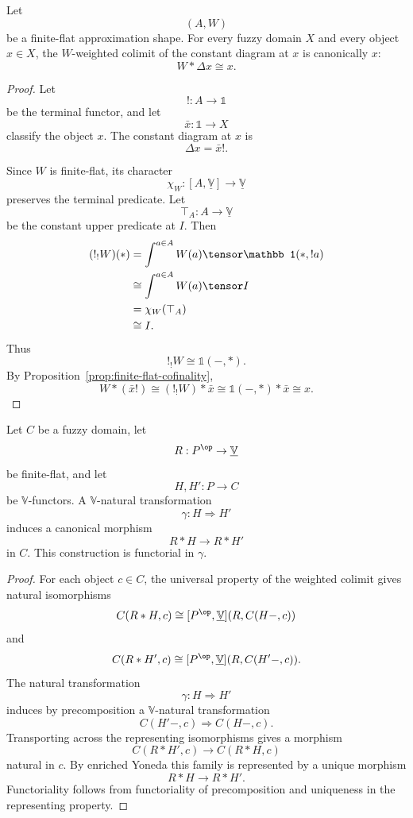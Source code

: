 \begin{lemma}
\label{lem:constant-diagrams-finite-flat}
Let
\[
    (A,W)
\]
be a finite-flat approximation shape.  For every fuzzy domain \(X\) and every
object \(x\in X\), the \(W\)-weighted colimit of the constant diagram at \(x\)
is canonically \(x\):
\[
    W*\Delta x\cong x.
\]
\end{lemma}

\begin{proof}
Let
\[
    !:A\to\mathbb 1
\]
be the terminal functor, and let
\[
    \bar x:\mathbb 1\to X
\]
classify the object \(x\).  The constant diagram at \(x\) is
\[
    \Delta x=\bar x!.
\]

Since \(W\) is finite-flat, its character
\[
    \chi_W:[A,\underline{\mathbb V}]\to\underline{\mathbb V}
\]
preserves the terminal predicate.  Let
\[
    \top_A:A\to\underline{\mathbb V}
\]
be the constant upper predicate at \(I\).  Then
\[
\begin{aligned}
    (!_!W)(*)
    &=
    \int^{a\in A}W(a)\tensor \mathbb 1(*,!a)
    \\
    &\cong
    \int^{a\in A}W(a)\tensor I
    \\
    &=
    \chi_W(\top_A)
    \\
    &\cong
    I.
\end{aligned}
\]
Thus
\[
    !_!W\cong \mathbb 1(-,*).
\]
By Proposition~\ref{prop:finite-flat-cofinality},
\[
    W*(\bar x!)
    \cong
    (!_!W)*\bar x
    \cong
    \mathbb 1(-,*)*\bar x
    \cong
    x.
\]
\end{proof}

\begin{lemma}
\label{lem:ff-colimits-functorial-in-diagrams}
Let \(C\) be a fuzzy domain, let
\[
    R:P^{\op}\to\underline{\mathbb V}
\]
be finite-flat, and let
\[
    H,H':P\to C
\]
be \(\mathbb V\)-functors.  A \(\mathbb V\)-natural transformation
\[
    \gamma:H\Rightarrow H'
\]
induces a canonical morphism
\[
    R*H\longrightarrow R*H'
\]
in \(C\).  This construction is functorial in \(\gamma\).
\end{lemma}

\begin{proof}
For each object \(c\in C\), the universal property of the weighted colimit gives
natural isomorphisms
\[
    C(R*H,c)
    \cong
    [P^{\op},\underline{\mathbb V}]
    (R,C(H-,c))
\]
and
\[
    C(R*H',c)
    \cong
    [P^{\op},\underline{\mathbb V}]
    (R,C(H'-,c)).
\]
The natural transformation
\[
    \gamma:H\Rightarrow H'
\]
induces by precomposition a \(\mathbb V\)-natural transformation
\[
    C(H'-,c)\Rightarrow C(H-,c).
\]
Transporting across the representing isomorphisms gives a morphism
\[
    C(R*H',c)\longrightarrow C(R*H,c)
\]
natural in \(c\).  By enriched Yoneda this family is represented by a unique
morphism
\[
    R*H\longrightarrow R*H'.
\]
Functoriality follows from functoriality of precomposition and uniqueness in
the representing property.
\end{proof}

